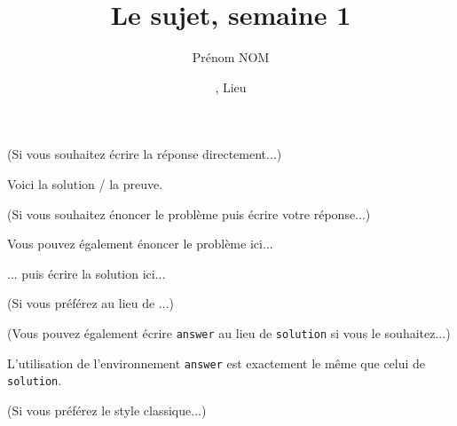 \documentclass[11pt,
  logo = {example-image},
  title in boldface,
  theorem in new line,
  colored solution,
]{homework}
\title{Le sujet, semaine 1}
\author{Prénom NOM}
\date{\TheDate{2026-01-01}, Lieu}
\begin{document}
\textcolor{gray!55}{(Si vous souhaitez écrire la réponse directement...)}

\begin{problem}
    Voici la solution / la preuve.
\end{problem}


\bigskip\textcolor{gray!55}{(Si vous souhaitez énoncer le problème puis écrire votre réponse...)}

\begin{problem}
    Vous pouvez également énoncer le problème ici...
\end{problem}

\begin{solution}
    ... puis écrire la solution ici...
\end{solution}

\bigskip\textcolor{gray!55}{(Si vous préférez  au lieu de ...)}



\bigskip\textcolor{gray!55}{(Vous pouvez également écrire \texttt{answer} au lieu de \texttt{solution} si vous le souhaitez...)}

\begin{answer}
    L'utilisation de l'environnement \verb|answer| est exactement le même que celui de \verb|solution|.
\end{answer}


\bigskip\textcolor{gray!55}{(Si vous préférez le style classique...)}
\end{document}
